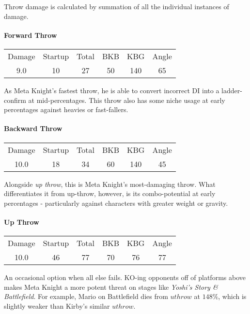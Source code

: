 Throw damage is calculated by summation of all the individual instances of damage.
\paragraph{Forward Throw}
\begin{center}
	\begin{tabular}{| c | c c | c c | c |}
		\hline
		Damage	&	Startup	&	Total	&	BKB	&	KBG	&	Angle	\\
		9.0	&	10	&	27	&	50	&	140	&	65\deg	\\		\hline
	\end{tabular}
\end{center}
As Meta Knight's fastest throw, he is able to convert incorrect DI into a ladder-confirm at mid-percentages. This throw also has some niche usage at early percentages against heavies or fast-fallers.
\paragraph{Backward Throw}
\begin{center}
	\begin{tabular}{| c | c c | c c | c |}
		\hline
		Damage	&	Startup	&	Total	&	BKB	&	KBG	&	Angle	\\
		10.0	&	18		&	34		&	60	&	140	&	45\deg	\\		\hline
	\end{tabular}
\end{center}
Alongside \textit{up throw}, this is Meta Knight's most-damaging throw. What differentiates it from up-throw, however, is its combo-potential at early percentages - particularly against characters with greater weight or gravity.
\paragraph{Up Throw}
\begin{center}
	\begin{tabular}{| c | c c | c c | c |}
		\hline
		Damage	&	Startup	&	Total	&	BKB	&	KBG	&	Angle	\\
		10.0	&	46		&	77		&	70	&	76	&	77\deg	\\		\hline
	\end{tabular}
\end{center}
An occasional option when all else fails. KO-ing opponents off of platforms above makes Meta Knight a more potent threat on stages like \textit{Yoshi's Story \& Battlefield}. For example, Mario on Battlefield dies from $uthrow$ at $148\%$, which is slightly weaker than Kirby's similar $uthrow$.
